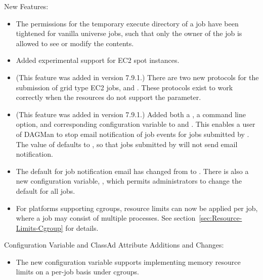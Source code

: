 \noindent New Features:

\begin{itemize}

\item The permissions for the temporary execute directory of a job
have been tightened for vanilla universe jobs, 
such that only the owner of the job is allowed to see or
modify the contents.

\item Added experimental support for EC2 spot instances.

\item (This feature was added in version 7.9.1.)  
There are two new protocols for the submission of grid type EC2 jobs,
 and .
These protocols exist to work correctly when the resources do not support 
the  parameter.

\item (This feature was added in version 7.9.1.)  
Added both a ,
a  command line option,
and corresponding
 configuration variable
to  and .
This enables a user of DAGMan to stop email notification of job
events for jobs submitted by . The value of
 defaults to ,
so that jobs submitted
by  will not send email notification. 

\item The default for job notification email has changed
from  to . 
There is also a new configuration variable, ,
which permits administrators to change the default for all jobs.

\item For platforms supporting cgroups,
resource limits can now be applied per job,
where a job may consist of multiple processes.
See section~\ref{sec:Resource-Limits-Cgroup} for details.

\end{itemize}

\noindent Configuration Variable and ClassAd Attribute Additions and Changes:

\begin{itemize}

\item The new configuration variable 
supports implementing memory resource limits on a per-job basis under cgroups.

\end{itemize}

